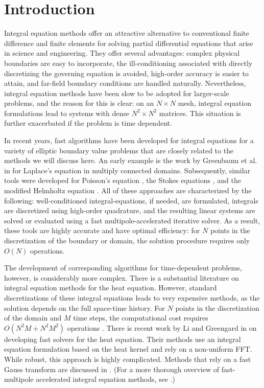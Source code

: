 \documentclass[preprint,12pt]{elsarticle}
\begin{document}
\section{Introduction}
Integral equation methods offer an attractive alternative to conventional finite difference and finite elements for solving partial differential equations that arise in science and engineering. 
They offer several advantages: complex physical boundaries are easy to incorporate, the ill-conditioning associated with directly discretizing the governing equation is avoided, high-order accuracy is easier to attain, and far-field boundary conditions are handled naturally.
Nevertheless, integral equation methods have been slow to be adopted for larger-scale problems, and the  reason for this is clear: on an $N\times N$ mesh, integral equation formulations lead to systems with dense $N^2 \times N^2$ matrices.
This situation is further exacerbated if the problem is time dependent. 

In recent years, fast algorithms have been developed for integral equations for a variety of elliptic boundary value problems that are closely related to the methods we will discuss here. An early example is the work by Greenbaum et al. in \cite{mult:conn} for Laplace's equation in multiply connected domains.
Subsequently, similar tools were developed for Poisson's equation \cite{greengard:ethridge}, the Stokes equations \cite{stokes:flow}, and the modified Helmholtz equation \cite{modified:helmholtz,KROP_QUAIFE_1}. 
All of these approaches are characterized by the following: well-conditioned integral-equations, if needed, are formulated, integrals are discretized using high-order quadrature, and the resulting linear systems are solved or evaluated using a fast multipole-accelerated iterative solver. As a result, these tools are highly accurate and have optimal efficiency: for $N$ points in the discretization of the boundary or domain, the solution procedure requires only $O(N)$ operations. 

The development of corresponding algorithms for time-dependent problems, however, is considerably more complex. There is a substantial literature on integral equation methods for the heat equation. However, standard discretizations of these integral equations leads to very expensive methods, as the solution depends on the full space-time history.  For $N$ points in the discretization of the domain and $M$ time steps, the computational cost requires $O(N^2M + N^2 M^2)$ operations \cite{heat_solver_1}.  There is recent work by Li and Greengard in \cite{heat_solver_1,heat_solver_2} on developing fast solvers for the heat equation. Their methods use an integral equation formulation based on the heat kernel and rely on a non-uniform FFT.  While robust, this approach is highly complicated. Methods that rely on a fast Gauss transform are discussed in \cite{tausch,SKVandGB,SKVandGB2}.
(For a more thorough overview of fast-multipole accelerated integral equation methods, see \cite{nishimura}.) 
\end{document}
